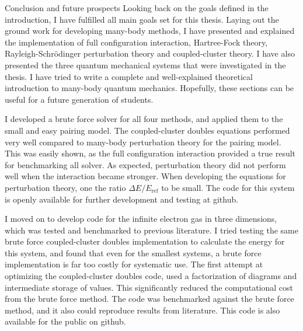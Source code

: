 \documentclass[twoside,english]{uiofysmaster}
\begin{document}
\begin{chapter}{Conclusion and future prospects}
	Looking back on the goals defined in the introduction, I have
        fulfilled all main goals set for this thesis. Laying out the
        ground work for developing many-body methods, I have presented
        and explained the implementation of full configuration
        interaction, Hartree-Fock theory, Rayleigh-Schr\"{o}dinger
        perturbation theory and coupled-cluster theory. I have also
        presented the three quantum mechanical systems that were
        investigated in the thesis. I have tried to write a complete
        and well-explained theoretical introduction to many-body
        quantum mechanics. Hopefully, these sections can be useful for
        a future generation of students.

  I developed a brute force solver for all four methods, and applied
  them to the small and easy pairing model. The coupled-cluster
  doubles equations performed very well compared to many-body
  perturbation theory for the pairing model. This was easily shown, as
  the full configuration interaction provided a true result for
  benchmarking all solver. As expected, perturbation theory did not
  perform well when the interaction became stronger. When developing
  the equations for perturbation theory, one the ratio $\Delta
  E/E_{\text{ref}}$ to be small. The code for this system is openly
  available for further development and testing at github.

  I moved on to develop code for the infinite electron gas in three
  dimensions, which was tested and benchmarked to previous
  literature. I tried testing the same brute force coupled-cluster
  doubles implementation to calculate the energy for this system, and
  found that even for the smallest systems, a brute force
  implementation is far too costly for systematic use. The first
  attempt at optimizing the coupled-cluster doubles code, used a
  factorization of diagrams and intermediate storage of values. This
  significantly reduced the computational cost from the brute force
  method. The code was benchmarked against the brute force method, and
  it also could reproduce results from literature. This code is
  also available for the public on github.


\end{chapter}
\end{document}
